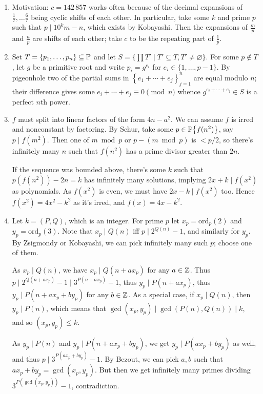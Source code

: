 \documentclass[11pt,paper=letter]{scrartcl}
\newcommand{\seq}[1]{\left\{#1\right\}}
\newcommand{\primeseq}[1]{\PP\!\seq{#1}}
\begin{document}
\begin{enumerate}
\item Motivation: $c = 142\,857$ works often because of the decimal expansions of $\frac17, \ldots \frac67$ being cyclic shifts of each other. In particular, take some $k$ and prime $p$ such that $p \mid 10^km - n$, which exists by Kobayashi. Then the expansions of $\frac mp$ and $\frac np$ are shifts of each other; take $c$ to be the repeating part of $\frac 1p$.

\item Set $T = \{p_1, \ldots, p_n\} \subseteq \mathbb P$ and let $S = \{\prod T' \mid T' \subseteq T, T' \ne \varnothing\}$. For some $p \not\in T$, let $g$ be a primitive root and write $p_i = g^{e_i}$ for $e_i \in \{1, \ldots, p - 1\}$. By pigeonhole two of the partial sums in $\seq{e_1 + \cdots + e_j}_{j = 1}^n$ are equal modulo $n$; their difference gives some $e_i + \cdots + e_j \equiv 0 \pmod n$ whence $g^{e_i + \cdots + e_j} \in S$ is a perfect $n$th power.

\item $f$ must split into linear factors of the form $4n - a^2$. We can assume $f$ is irred and nonconstant by factoring. By Schur, take some $p \in \primeseq{f(n^2)}$, say $p \mid f(m^2)$. Then one of $m \bmod p$ or $p - (m \bmod p)$ is $< p/2$, so there's infinitely many $n$ such that $f(n^2)$ has a prime divisor greater than $2n$.

If the sequence was bounded above, there's some $k$ such that $p(f(n^2)) - 2n = k$ has infinitely many solutions, implying $2x + k \mid f(x^2)$ as polynomials. As $f(x^2)$ is even, we must have $2x - k \mid f(x^2)$ too. Hence $f(x^2) = 4x^2 - k^2$ as it's irred, and $f(x) = 4x - k^2$.

\item Let $k = (P, Q)$, which is an integer. For prime $p$ let $x_p = \mathrm{ord}_p(2)$ and $y_p = \mathrm{ord}_p(3)$. Note that $x_p \mid Q(n)$ iff $p \mid 2^{Q(n)} - 1$, and similarly for $y_p$. By Zsigmondy or Kobayashi, we can pick infinitely many such $p$; choose one of them.

As $x_p \mid Q(n)$, we have $x_p \mid Q(n + ax_p)$ for any $a \in \mathbb Z$. Thus $p \mid 2^{Q(n + ax_p)} - 1 \mid 3^{P(n + ax_p)} - 1$, thus $y_p \mid P(n + ax_p)$, thus $y_p \mid P(n + ax_p + by_p)$ for any $b \in \mathbb Z$. As a special case, if $x_p \mid Q(n)$, then $y_p \mid P(n)$, which means that $\gcd(x_p, y_p) \mid \gcd(P(n), Q(n)) \mid k$, and so $(x_p, y_p) \le k$.

As $y_p \mid P(n)$ and $y_p \mid P(n + ax_p + by_p)$, we get $y_p \mid P(ax_p + by_p)$ as well, and thus $p \mid 3^{P(ax_p + by_p)} - 1$. By Bezout, we can pick $a, b$ such that $ax_p + by_p = \gcd(x_p, y_p)$. But then we get infinitely many primes dividing $3^{P(\gcd(x_p, y_p))} - 1$, contradiction.


\end{enumerate}
\end{document}
